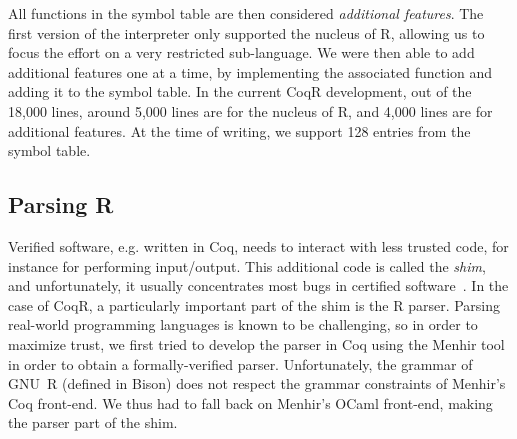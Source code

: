 \documentclass[
    sigplan,
    10pt,
    review, %
    natbib=false %
 ]{acmart}
\newcommand\mb[1]{\todo[color=purple!20,size=\scriptsize]{#1}}
\newcommand\et[1]{\todo[color=blue!20,size=\scriptsize]{#1}}
\newcommand\eti[1]{\todo[color=blue!20,inline]{#1}}
\newcommand\CoqR{CoqR}
\begin{document}
All functions in the symbol table are then considered {\em additional features}. The first version of the interpreter only supported the nucleus of R, allowing us to focus the effort on a very restricted sub-language.
We were then able to add additional features one at a time, by implementing
the associated function and adding it to the symbol table.
In the current \CoqR{} development, out of the 18,000 lines,
around 5,000 lines are for the nucleus of R,
and 4,000 lines are for additional features.
At the time of writing, we support 128 entries from the symbol table.


\subsection{Parsing R}
\label{sec:parsing}

Verified software, e.g. written in Coq, needs to interact with less trusted code, for instance for performing input/output. This additional code is called the \emph{shim}, and unfortunately, it usually concentrates most bugs in certified software~\parencite{Yang:2011:FUB:1993498.1993532}.
In the case of \CoqR{}, a particularly important part of the shim is the R parser. Parsing real-world programming languages is known to be challenging, so in order to maximize trust, we first tried to develop the parser in Coq
using the Menhir tool~\parencite{jourdan2012validating} in order to obtain a formally-verified parser. Unfortunately, the grammar of GNU~R (defined in Bison) does not respect the grammar constraints of Menhir's Coq front-end. We thus had to fall back on Menhir's OCaml front-end, making the parser part of the shim.
\end{document}
